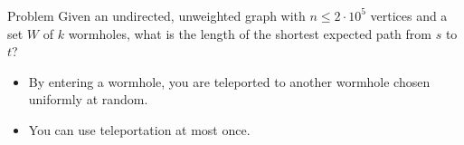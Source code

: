 \begin{frame}[t]
    \frametitle{\problemtitle}

    \begin{block}{Problem}
        Given an undirected, unweighted graph with $n \leq 2 \cdot 10^5$ vertices and a set $W$ of $k$ wormholes, 
        what is the length of the shortest expected path from $s$ to $t$?  

        \begin{itemize}
            \item By entering a wormhole, you are teleported to another wormhole chosen uniformly at random.  
            \item You can use teleportation at most once. 
        \end{itemize}
    \end{block}


\end{frame}
